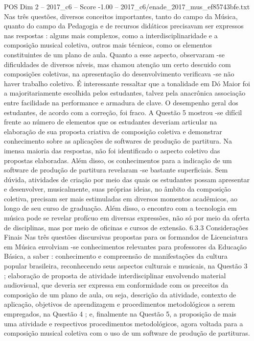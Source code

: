 \begin{textsample}{POS Dim 2 – 2017\_c6 – Score -1.00 – 2017\_c6/enade\_2017\_mus\_ef85743bfe.txt}
Nas três questões, diversos conceitos importantes, tanto do campo da Música, quanto do campo da Pedagogia e de recursos didáticos precisavam ser expressos nas respostas : alguns mais complexos, como a interdisciplinaridade e a composição musical coletiva, outros mais técnicos, como os elementos constituintes de um plano de aula.
Quanto a esse aspecto, observaram -se dificuldades de diversos níveis, mas chamou atenção um certo descuido com composições coletivas, na apresentação do desenvolvimento verificava -se não haver trabalho coletivo.
É interessante ressaltar que a tonalidade em Dó Maior foi a majoritariamente escolhida pelos estudantes, talvez pela anacrônica associação entre facilidade na performance e armadura de clave.
O desempenho geral dos estudantes, de acordo com a correção, foi fraco.
A Questão 5 mostrou -se difícil frente ao número de elementos que os estudantes deveriam articular na elaboração de sua proposta criativa de composição coletiva e demonstrar conhecimento sobre as aplicações de softwares de produção de partitura.
Na imensa maioria das respostas, não foi identificado o aspecto coletivo das propostas elaboradas.
Além disso, os conhecimentos para a indicação de um software de produção de partitura revelaram -se bastante superficiais.
Sem dúvida, atividades de criação por meio das quais os estudantes possam apresentar e desenvolver, musicalmente, suas próprias ideias, no âmbito da composição coletiva, precisam ser mais estimuladas em diversos momentos acadêmicos, ao longo de seu curso de graduação.
Além disso, o encontro com a tecnologia em música pode se revelar profícuo em diversas expressões, não só por meio da oferta de disciplinas, mas por meio de oficinas e cursos de extensão. 6.3.3 Considerações Finais Nas três questões discursivas propostas para os formandos de Licenciatura em Música envolviam -se conhecimentos relevantes para professores da Educação Básica, a saber : conhecimento e compreensão de manifestações da cultura popular brasileira, reconhecendo seus aspectos culturais e musicais, na Questão 3 ; elaboração de proposta de atividade interdisciplinar envolvendo material audiovisual, que deveria ser expressa em conformidade com os preceitos da composição de um plano de aula, ou seja, descrição da atividade, contexto de aplicação, objetivos de aprendizagem e procedimentos metodológicos a serem empregados, na Questão 4 ; e, finalmente na Questão 5, a proposição de mais uma atividade e respectivos procedimentos metodológicos, agora voltada para a composição musical coletiva com o uso de um software de produção de partituras.

\end{textsample}
